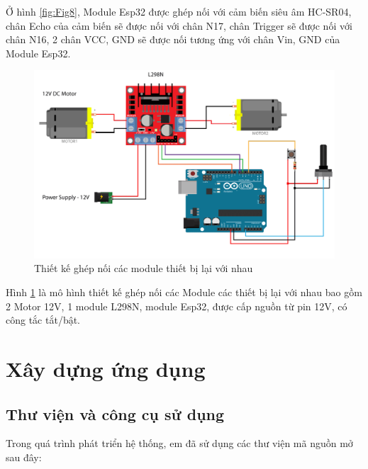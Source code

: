 \documentclass[../DoAn.tex]{subfiles}
\begin{document}
Ở hình \ref{fig:Fig8}, Module Esp32 được ghép nối với cảm biến siêu âm HC-SR04, chân Echo của cảm biến sẽ được nối với chân N17, chân Trigger sẽ được nối với chân N16, 2 chân VCC, GND sẽ được nối tương ứng với chân Vin, GND của Module Esp32.

\begin{figure}[H]
    \centering
    \includegraphics[scale = 0.55]{Hinhve/graft_modules.png}
    \caption{Thiết kế ghép nối các module thiết bị lại với nhau}
    \label{fig:Fig9}
\end{figure}

Hình \ref{fig:Fig9} là mô hình thiết kế ghép nối các Module các thiết bị lại với nhau bao gồm 2 Motor 12V, 1 module L298N, module Esp32, được cấp nguồn từ pin 12V, có công tắc tắt/bật.



\section{Xây dựng ứng dụng}
\subsection{Thư viện và công cụ sử dụng}

Trong quá trình phát triển hệ thống, em đã sử dụng các thư viện mã nguồn mở sau đây:
\end{document}
